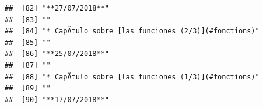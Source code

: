 \documentclass[
]{book}
\begin{document}
\begin{verbatim}
##  [82] "**27/07/2018**"                                                                                                                                                                                                                                                                                          
##  [83] ""                                                                                                                                                                                                                                                                                                        
##  [84] "* CapÃ­tulo sobre [las funciones (2/3)](#fonctions)"                                                                                                                                                                                                                                                     
##  [85] ""                                                                                                                                                                                                                                                                                                        
##  [86] "**25/07/2018**"                                                                                                                                                                                                                                                                                          
##  [87] ""                                                                                                                                                                                                                                                                                                        
##  [88] "* CapÃ­tulo sobre [las funciones (1/3)](#fonctions)"                                                                                                                                                                                                                                                     
##  [89] ""                                                                                                                                                                                                                                                                                                        
##  [90] "**17/07/2018**"                                                                                                                                                                                                                                                                                          

\end{verbatim}
\end{document}
